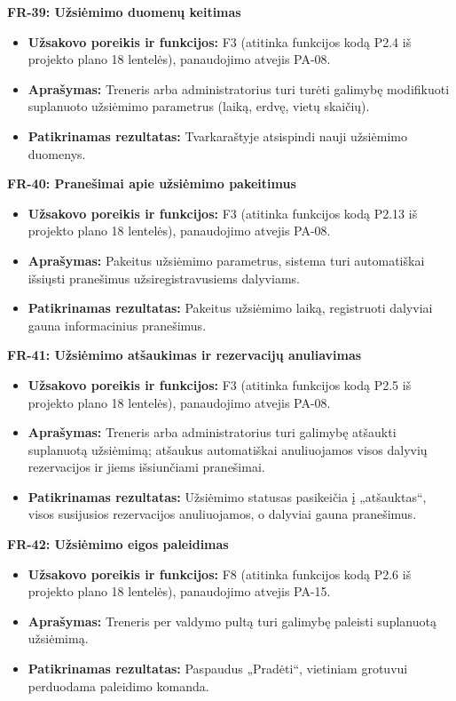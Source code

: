 \vspace{0.3cm}
\noindent\textbf{FR-39: Užsiėmimo duomenų keitimas}
\begin{itemize}
    \item \textbf{Užsakovo poreikis ir funkcijos:} F3 (atitinka funkcijos kodą P2.4 iš projekto plano 18 lentelės), panaudojimo atvejis PA-08.
    \item \textbf{Aprašymas:} Treneris arba administratorius turi turėti galimybę modifikuoti suplanuoto užsiėmimo parametrus (laiką, erdvę, vietų skaičių).
    \item \textbf{Patikrinamas rezultatas:} Tvarkaraštyje atsispindi nauji užsiėmimo duomenys.
\end{itemize}

\vspace{0.3cm}
\noindent\textbf{FR-40: Pranešimai apie užsiėmimo pakeitimus}
\begin{itemize}
    \item \textbf{Užsakovo poreikis ir funkcijos:} F3 (atitinka funkcijos kodą P2.13 iš projekto plano 18 lentelės), panaudojimo atvejis PA-08.
    \item \textbf{Aprašymas:} Pakeitus užsiėmimo parametrus, sistema turi automatiškai išsiųsti pranešimus užsiregistravusiems dalyviams.
    \item \textbf{Patikrinamas rezultatas:} Pakeitus užsiėmimo laiką, registruoti dalyviai gauna informacinius pranešimus.
\end{itemize}

\vspace{0.3cm}
\noindent\textbf{FR-41: Užsiėmimo atšaukimas ir rezervacijų anuliavimas}
\begin{itemize}
    \item \textbf{Užsakovo poreikis ir funkcijos:} F3 (atitinka funkcijos kodą P2.5 iš projekto plano 18 lentelės), panaudojimo atvejis PA-08.
    \item \textbf{Aprašymas:} Treneris arba administratorius turi galimybę atšaukti suplanuotą užsiėmimą; atšaukus automatiškai anuliuojamos visos dalyvių rezervacijos ir jiems išsiunčiami pranešimai.
    \item \textbf{Patikrinamas rezultatas:} Užsiėmimo statusas pasikeičia į „atšauktas“, visos susijusios rezervacijos anuliuojamos, o dalyviai gauna pranešimus.
\end{itemize}

\vspace{0.3cm}
\noindent\textbf{FR-42: Užsiėmimo eigos paleidimas}
\begin{itemize}
    \item \textbf{Užsakovo poreikis ir funkcijos:} F8 (atitinka funkcijos kodą P2.6 iš projekto plano 18 lentelės), panaudojimo atvejis PA-15.
    \item \textbf{Aprašymas:} Treneris per valdymo pultą turi galimybę paleisti suplanuotą užsiėmimą.
    \item \textbf{Patikrinamas rezultatas:} Paspaudus „Pradėti“, vietiniam grotuvui perduodama paleidimo komanda.
\end{itemize}

